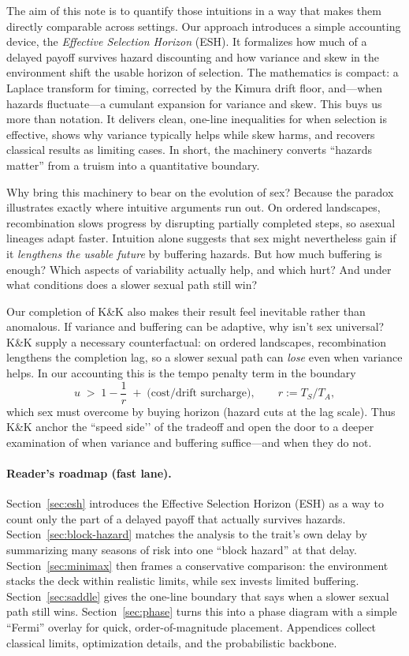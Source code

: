 \documentclass[11pt]{article}
\theoremstyle{upright}
\begin{document}
The aim of this note is to quantify those intuitions in a way that makes them
directly comparable across settings. Our approach
introduces a simple accounting device, the \emph{Effective Selection Horizon}
(ESH). It formalizes how much of a delayed payoff survives hazard discounting
and how variance and skew in the environment shift the usable horizon of
selection. The mathematics is compact: a Laplace transform for timing,
corrected by the Kimura drift floor, and---when hazards fluctuate---a cumulant expansion
for variance and skew. This buys us more than notation. It delivers clean,
one-line inequalities for when selection is effective, shows why variance
typically helps while skew harms, and recovers classical results as limiting
cases. In short, the machinery converts “hazards matter” from a truism into a
quantitative boundary.

Why bring this machinery to bear on the evolution of sex? Because the \citet{Kondrashov2001} 
paradox illustrates exactly where intuitive arguments run out.
On ordered landscapes, recombination slows progress by disrupting partially
completed steps, so asexual lineages adapt faster. Intuition alone suggests
that sex might nevertheless gain if it \emph{lengthens the usable future} by buffering hazards.
But how much buffering is enough? Which aspects of variability actually help,
and which hurt? And under what conditions does a slower sexual path still win?

Our completion of K\&K also makes their result feel inevitable rather than anomalous.
If variance and buffering can be adaptive, why isn’t sex universal?
K\&K supply a necessary counterfactual: on ordered landscapes, recombination 
lengthens the completion lag, so a slower sexual path can \emph{lose} even when variance helps.
In our accounting this is the tempo penalty term in the boundary
\[
u \;>\; 1-\frac{1}{r}\;+\;\text{(cost/drift surcharge)},
\qquad r:=T_S/T_A,
\]
which sex must overcome by buying horizon (hazard cuts at the lag scale).
Thus K\&K anchor the “speed side’’ of the tradeoff and open the door to a deeper 
examination of when variance and buffering suffice—and when they do not.

\paragraph{Reader’s roadmap (fast lane).}
Section~\ref{sec:esh} introduces the Effective Selection Horizon (ESH) as a way to count only the part of a delayed payoff that actually survives hazards. 
Section~\ref{sec:block-hazard} matches the analysis to the trait’s own delay by summarizing many seasons of risk into one “block hazard” at that delay. 
Section~\ref{sec:minimax} then frames a conservative comparison: the environment stacks the deck within realistic limits, while sex invests limited buffering. 
Section~\ref{sec:saddle} gives the one-line boundary that says when a slower sexual path still wins. 
Section~\ref{sec:phase} turns this into a phase diagram with a simple “Fermi” overlay for quick, order-of-magnitude placement. 
Appendices collect classical limits, optimization details, and the probabilistic backbone.
\end{document}
